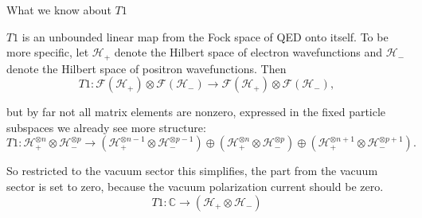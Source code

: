 \documentclass[a4paper,12pt]{article}
\begin{document}
\begin{center}
{\Large What we know about \(T1\)}
\end{center}
 
 \(T1\) is an unbounded linear map from  the Fock space of QED onto itself. To be more specific, let \(\mathcal{H}_+\) denote the Hilbert space of electron wavefunctions and \(\mathcal{H}_-\) denote the Hilbert space of positron wavefunctions. Then
\begin{equation}
T1: \mathcal{F}\left( \mathcal{H}_+\right)\otimes\mathcal{F}\left( \mathcal{H}_-\right) \rightarrow \mathcal{F}\left( \mathcal{H}_+\right)\otimes\mathcal{F}\left( \mathcal{H}_-\right) ,
\end{equation}

but by far not all matrix elements are nonzero, expressed in the fixed particle subspaces we already see more structure:
\begin{equation}
T1:  \mathcal{H}_+^{\otimes n}  \otimes \mathcal{H}_-^{\otimes p} \rightarrow\left(\mathcal{H}_+^{\otimes n-1}  \otimes \mathcal{H}_-^{\otimes p-1}\right) \oplus \left(\mathcal{H}_+^{\otimes n}  \otimes \mathcal{H}_-^{\otimes p}\right) \oplus \left(\mathcal{H}_+^{\otimes n +1}  \otimes \mathcal{H}_-^{\otimes p+1}\right)  .
\end{equation}

So restricted to the vacuum sector this simplifies, the part from the vacuum sector is set to zero, because the vacuum polarization current should be zero.
\begin{equation}
T1:  \mathbb{C} \rightarrow  \left(\mathcal{H}_+ \otimes \mathcal{H}_-\right)
\end{equation}
\end{document}
